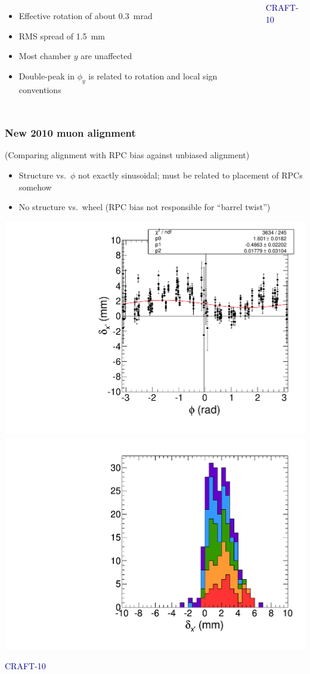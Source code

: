 \documentclass[compress]{beamer}
\begin{document}
\begin{frame}
\begin{columns}
\begin{itemize}
\item Effective rotation of about 0.3~mrad
\item RMS spread of 1.5~mm
\item Most chamber $y$ are unaffected
\item Double-peak in $\phi_y$ is related to rotation and local sign conventions
\end{itemize}

\hfill \textcolor{darkblue}{\scriptsize CRAFT-10}
\end{columns}
\end{frame}

\begin{frame}
\frametitle{New 2010 muon alignment}

(Comparing alignment with RPC bias against unbiased alignment)

\begin{itemize}
\item Structure vs.\ $\phi$ not exactly sinusoidal; must be related to placement of RPCs somehow
\item No structure vs.\ wheel (RPC bias not responsible for ``barrel twist'')
\end{itemize}

\includegraphics[width=0.5\linewidth]{05_deltax_phi_with_and_without_RPC.pdf}
\includegraphics[width=0.5\linewidth]{06_deltax_stack_with_and_without_RPC.pdf}

\hfill \textcolor{darkblue}{\scriptsize CRAFT-10}
\end{frame}
\end{document}
